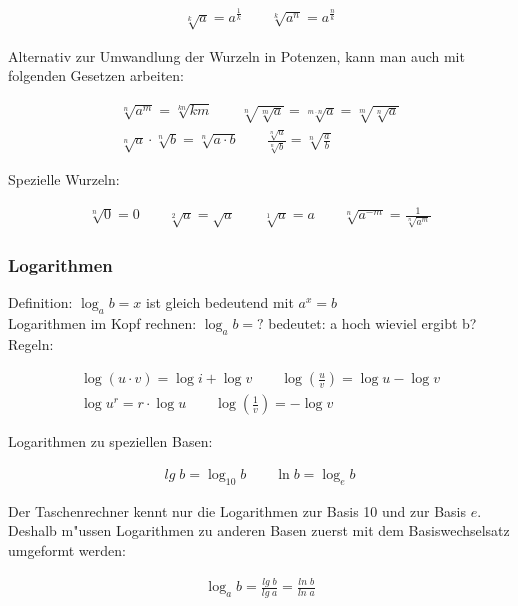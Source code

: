 \documentclass[a4paper]{article}
\begin{document}
\begin{align*}
	\sqrt[k]{a} = a^\frac{1}{k} \qquad \sqrt[k]{a^n} = a^\frac{n}{k}
\end{align*}

Alternativ zur Umwandlung der Wurzeln in Potenzen, kann man auch mit folgenden Gesetzen arbeiten:

\begin{align*}
	\sqrt[n]{a^m} = \sqrt[kn]{km} \qquad \sqrt[n]{\sqrt[m]{a}} = \sqrt[m \cdot n]{a} = \sqrt[m]{\sqrt[n]{a}}\\
	\sqrt[n]{a} \cdot \sqrt[n]{b} = \sqrt[n]{a \cdot b} \qquad \frac{\sqrt[n]{a}}{\sqrt[n]{b}} = \sqrt[n]{\frac{a}{b}}
\end{align*}

Spezielle Wurzeln:

\begin{align*}
	\sqrt[n]{0} = 0 \qquad \sqrt[2]{a} = \sqrt{a} \qquad \sqrt[1]{a} = a \qquad \sqrt[n]{a^{-m}} = \frac{1}{\sqrt[n]{a^m}}
\end{align*}



\subsubsection*{Logarithmen}

Definition: $\log_ab = x$ ist gleich bedeutend mit $a^x = b$\\
Logarithmen im Kopf rechnen: $\log_ab = ?$ bedeutet: a hoch wieviel ergibt b?\\

Regeln:

\begin{align*}
	\log(u \cdot v) = \log i + \log v \qquad \log\left(\frac{u}{v}\right) = \log u - \log v\\
	\log u^r = r \cdot \log u \qquad \log\left( \frac{1}{v}\right) = - \log v
\end{align*}

Logarithmen zu speziellen Basen:

\begin{align*}
	lg \; b = \log_{10} b \qquad \ln b = \log_e b
\end{align*}

Der Taschenrechner kennt nur die Logarithmen zur Basis 10 und zur Basis $e$. Deshalb m"ussen Logarithmen zu anderen Basen zuerst mit dem Basiswechselsatz umgeformt werden:

\begin{align*}
 \log_ab = \frac{lg \; b}{lg \; a} = \frac{ln \; b}{ln \; a}
\end{align*}
\end{document}
